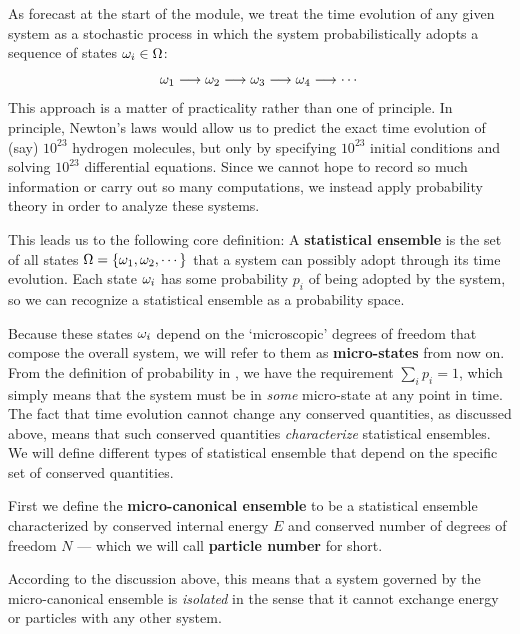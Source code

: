As forecast at the start of the module, we treat the time evolution of any given system as a stochastic process in which the system probabilistically adopts a sequence of states $\omega_i \in \Omega$:
\begin{equation*}
  \omega_1 \longrightarrow \omega_2 \longrightarrow \omega_3 \longrightarrow \omega_4 \longrightarrow \cdots
\end{equation*}
This approach is a matter of practicality rather than one of principle.
In principle, Newton's laws would allow us to predict the exact time evolution of (say) $10^{23}$ hydrogen molecules, but only by specifying $10^{23}$ initial conditions and solving $10^{23}$ differential equations.
Since we cannot hope to record so much information or carry out so many computations, we instead apply probability theory in order to analyze these systems.

\begin{shaded}
  This leads us to the following core definition: A \textbf{statistical ensemble} is the set of all states $\Omega = \left\{\omega_1, \omega_2, \cdots\right\}$ that a system can possibly adopt through its time evolution.
  Each state $\omega_i$ has some probability $p_i$ of being adopted by the system, so we can recognize a statistical ensemble as a probability space.
\end{shaded}

Because these states $\omega_i$ depend on the `microscopic' degrees of freedom that compose the overall system, we will refer to them as \textbf{micro-states} from now on.
From the definition of probability in , we have the requirement $\sum_i p_i = 1$, which simply means that the system must be in \textit{some} micro-state at any point in time.
The fact that time evolution cannot change any conserved quantities, as discussed above, means that such conserved quantities \textit{characterize} statistical ensembles.
We will define different types of statistical ensemble that depend on the specific set of conserved quantities.

\begin{shaded}
  First we define the \textbf{micro-canonical ensemble} to be a statistical ensemble characterized by conserved internal energy $E$ and conserved number of degrees of freedom $N$ --- which we will call \textbf{particle number} for short.
\end{shaded}

According to the discussion above, this means that a system governed by the micro-canonical ensemble is \textit{isolated} in the sense that it cannot exchange energy or particles with any other system.

